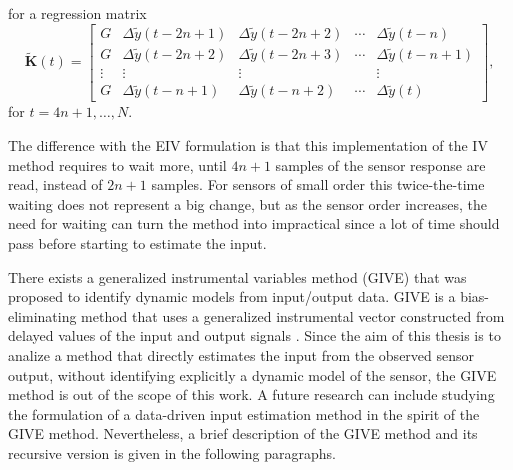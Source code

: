 \documentclass[11pt]{article}
\begin{document}
\begin{itemize}
\begin{itemize}
        for a regression matrix
        \begin{equation} \tag{4.26} \widetilde{\mathbf{K}}(t) = \begin{bmatrix} G & \Delta \widetilde{y}(t-2n+1) & \Delta \widetilde{y}(t-2n+2) & \cdots & \Delta \widetilde{y}(t-n) \\ G & \Delta \widetilde{y}(t-2n+2) & \Delta \widetilde{y}(t-2n+3) & \cdots & \Delta \widetilde{y}(t-n+1) \\ \vdots & \vdots & \vdots & & \vdots \\ G & \Delta \widetilde{y}(t-n+1) & \Delta \widetilde{y}(t-n+2) & \cdots & \Delta \widetilde{y}(t) \end{bmatrix} , \label{eqn:matrixK_t} \end{equation}
        for $t = 4n+1, \ldots, N$.

        The difference with the EIV formulation is that this implementation of the IV method requires to wait more, until $4n+1$ samples of the sensor response are read, instead of $2n+1$ samples. 
        For sensors of small order this twice-the-time waiting does not represent a big change, but as the sensor order increases, the need for waiting can turn the method into impractical since a lot of time should pass before starting to estimate the input. 
    
        There exists a generalized instrumental variables method (GIVE) that was proposed to identify dynamic models from input/output data. 
        GIVE is a bias-eliminating method that uses a generalized instrumental vector constructed from delayed values of the input and output signals \cite{Soderstrom18}.
        Since the aim of this thesis is to analize a method that directly estimates the input from the observed sensor output, without identifying explicitly a dynamic model of the sensor, the GIVE method is out of the scope of this work. 
        A future research can include studying the formulation of a data-driven input estimation method in the spirit of the GIVE method. 
        Nevertheless, a brief description of the GIVE method and its recursive version is given in the following paragraphs.
    

\end{itemize}
\end{itemize}
\end{document}
